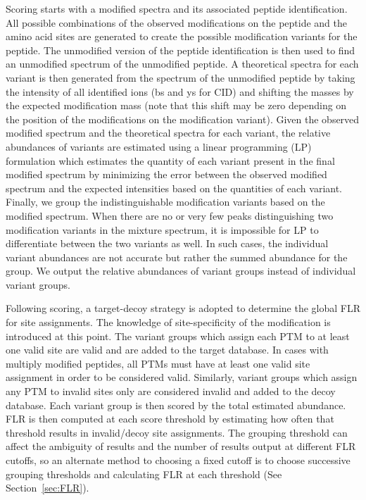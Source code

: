 \documentclass[11pt]{article}
\begin{document}
Scoring starts with a modified spectra and its associated peptide identification. All possible combinations of the observed modifications on the peptide and the amino acid sites are generated to create the possible modification variants for the peptide. The unmodified version of the peptide identification is then used to find an unmodified spectrum of the unmodified peptide. A theoretical spectra for each variant is then generated from the spectrum of the unmodified peptide by taking the intensity of all identified ions (bs and ys for CID) and shifting the masses by the expected modification mass (note that this shift may be zero depending on the position of the modifications on the modification variant). Given the observed modified spectrum and the theoretical spectra for each variant, the relative abundances of variants are estimated using a linear programming (LP) formulation which estimates the quantity of each variant present in the final modified spectrum by minimizing the error between the observed modified spectrum and the expected intensities based on the quantities of each variant. Finally, we group the indistinguishable modification variants based on the modified spectrum. When there are no or very few peaks distinguishing two modification variants in the mixture spectrum, it is impossible for LP to differentiate between the two variants as well. In such cases, the individual variant abundances are not accurate but rather the summed abundance for the group. We output the relative abundances of variant groups instead of individual variant groups. 

Following scoring, a target-decoy strategy is adopted to determine the global FLR for site assignments. The knowledge of site-specificity of the modification is introduced at this point. The variant groups which assign each PTM to at least one valid site are valid and are added to the target database. In cases with multiply modified peptides, all PTMs must have at least one valid site assignment in order to be considered valid. Similarly, variant groups which assign any PTM to invalid sites only are considered invalid and added to the decoy database. Each variant group is then scored by the total estimated abundance. FLR is then computed at each score threshold by estimating how often that threshold results in invalid/decoy site assignments. The grouping threshold can affect the ambiguity of results and the number of results output at different FLR cutoffs, so an alternate method to choosing a fixed cutoff is to choose successive grouping thresholds and calculating FLR at each threshold (See Section~\ref{sec:FLR}).
\end{document}
